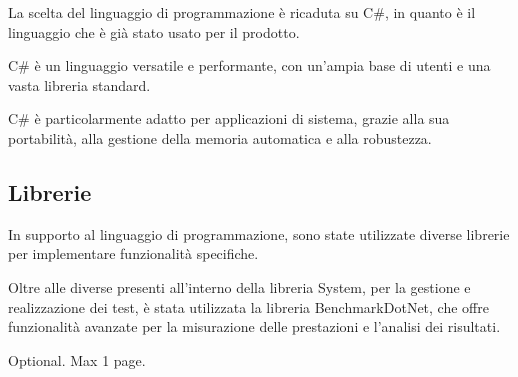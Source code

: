 \documentclass[12pt,a4paper,openright,twoside]{book}
\begin{document}
            La scelta del linguaggio di programmazione è ricaduta su C\#, in quanto è il linguaggio che è già stato usato per il prodotto.

            C\# è un linguaggio versatile e performante, con un'ampia base di utenti e una vasta libreria standard.

            C\# è particolarmente adatto per applicazioni di sistema, grazie alla sua portabilità, alla gestione della memoria automatica e alla robustezza.

        \subsection{Librerie}

            In supporto al linguaggio di programmazione, sono state utilizzate diverse librerie per implementare funzionalità specifiche.

            Oltre alle diverse presenti all'interno della libreria System, per la gestione e realizzazione dei test, è stata utilizzata la libreria BenchmarkDotNet, che offre funzionalità avanzate per la misurazione delle prestazioni e l'analisi dei risultati.










\backmatter

\nocite{*} %




\begin{acknowledgements} %
Optional. Max 1 page.
\end{acknowledgements}
\end{document}
